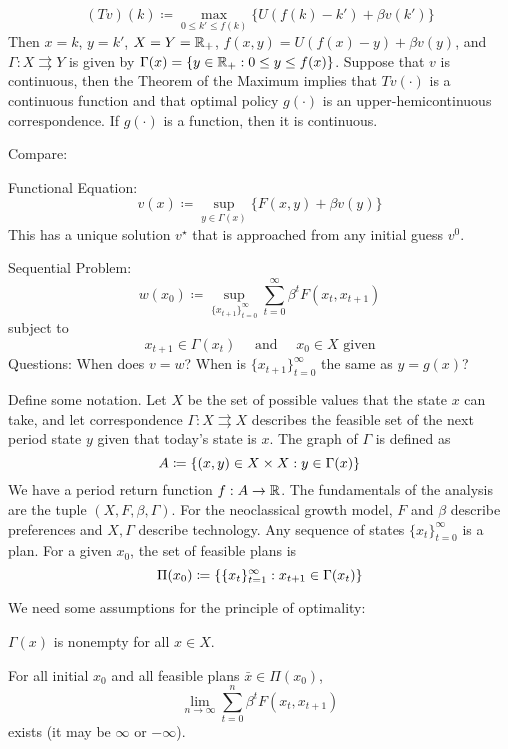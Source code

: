 \documentclass[10pt]{article}
\begin{document}
\begin{example}
\[
(Tv)(k) \coloneqq \max_{0 \le k' \le f(k)} \{U(f(k) - k') + \beta v(k')\}
\]
Then $x = k$, $y = k'$, $X = Y = \mathbb{R}_+$, $f(x,y) = U(f(x) - y) + \beta v(y)$, and $\Gamma : X \rightrightarrows Y$ is given by $\Gamma(x) = \{y \in \mathbb{R}_+ : 0 \le y \le f(x)\}$. Suppose that $v$ is continuous, then the Theorem of the Maximum implies that $Tv(\cdot)$ is a continuous function and that optimal policy $g(\cdot)$ is an upper-hemicontinuous correspondence. If $g(\cdot)$ is a function, then it is continuous.
\end{example}

\begin{example}
Compare:

Functional Equation:
\[
v(x) \coloneqq \sup_{y \in \Gamma(x)} \{F(x,y) + \beta v(y)\}
\]
This has a unique solution $v^\star$ that is approached from any initial guess $v^0$.

Sequential Problem:
\[
w(x_0) \coloneqq \sup_{\{x_{t+1}\}_{t=0}^\infty} \sum_{t=0}^\infty \beta^t F(x_t,x_{t+1})
\]
subject to
\[
x_{t+1} \in \Gamma(x_t) \quad \text{ and } \quad x_0 \in X \text{ given}
\]
Questions: When does $v = w$? When is $\{x_{t+1}\}_{t=0}^\infty$ the same as $y = g(x)$?
\end{example}

\begin{model}
	 Define some notation. Let $X$ be the set of possible values that the state $x$ can take, and let correspondence $\Gamma : X \rightrightarrows X$ describes the feasible set of the next period state $y$ given that today's state is $x$. The graph of $\Gamma$ is defined as
		\[
		A \coloneqq \left\{ (x,y) \in X \times X : y \in \Gamma(x) \right\}
		\]
		We have a period return function $f: A \to \mathbb{R}$. The fundamentals of the analysis are the tuple $(X,F,\beta,\Gamma)$. For the neoclassical growth model, $F$ and $\beta$ describe preferences and $X, \Gamma$ describe technology. Any sequence of states $\{x_t\}_{t=0}^\infty$ is a plan. For a given $x_0$, the set of feasible plans is
		\[
		\Pi(x_0) \coloneqq \left\{ \{x_t\}_{t=1}^\infty : x_{t+1} \in \Gamma(x_t) \right\}
		\]
\end{model}

We need some assumptions for the principle of optimality:
\begin{assumption}
	$\Gamma(x)$ is nonempty for all $x \in X$.
\end{assumption}
\begin{assumption}
	For all initial $x_0$ and all feasible plans $\bar{x} \in \Pi(x_0)$,
	\[
	\lim_{n\to\infty} \sum_{t=0}^n \beta^t F(x_t,x_{t+1})
	\]
	exists (it may be $\infty$ or $-\infty$).
\end{assumption}
\end{document}
